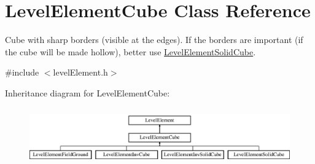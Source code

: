 \hypertarget{classLevelElementCube}{
\section{\-Level\-Element\-Cube \-Class \-Reference}
\label{d4/dce/classLevelElementCube}
}


\-Cube with sharp borders (visible at the edges). \-If the borders are important (if the cube will be made hollow), better use \hyperlink{classLevelElementSolidCube}{\-Level\-Element\-Solid\-Cube}.  




{\ttfamily \#include $<$level\-Element.\-h$>$}

\-Inheritance diagram for \-Level\-Element\-Cube\-:\begin{figure}[H]
\begin{center}
\leavevmode
\includegraphics[height=2.470588cm]{d4/dce/classLevelElementCube}
\end{center}
\end{figure}
